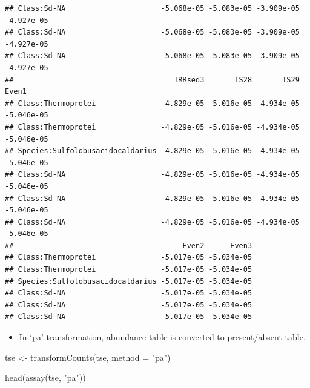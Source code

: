 \documentclass[
]{book}
\newenvironment{Shaded}{\begin{snugshade}}{\end{snugshade}}
\newcommand{\AttributeTok}[1]{\textcolor[rgb]{0.77,0.63,0.00}{#1}}
\newcommand{\FunctionTok}[1]{\textcolor[rgb]{0.00,0.00,0.00}{#1}}
\newcommand{\NormalTok}[1]{#1}
\newcommand{\OtherTok}[1]{\textcolor[rgb]{0.56,0.35,0.01}{#1}}
\newcommand{\StringTok}[1]{\textcolor[rgb]{0.31,0.60,0.02}{#1}}
\providecommand{\tightlist}{%
  \setlength{\itemsep}{0pt}\setlength{\parskip}{0pt}}
\begin{document}
\begin{verbatim}
## Class:Sd-NA                      -5.068e-05 -5.083e-05 -3.909e-05 -4.927e-05
## Class:Sd-NA                      -5.068e-05 -5.083e-05 -3.909e-05 -4.927e-05
## Class:Sd-NA                      -5.068e-05 -5.083e-05 -3.909e-05 -4.927e-05
##                                     TRRsed3       TS28       TS29      Even1
## Class:Thermoprotei               -4.829e-05 -5.016e-05 -4.934e-05 -5.046e-05
## Class:Thermoprotei               -4.829e-05 -5.016e-05 -4.934e-05 -5.046e-05
## Species:Sulfolobusacidocaldarius -4.829e-05 -5.016e-05 -4.934e-05 -5.046e-05
## Class:Sd-NA                      -4.829e-05 -5.016e-05 -4.934e-05 -5.046e-05
## Class:Sd-NA                      -4.829e-05 -5.016e-05 -4.934e-05 -5.046e-05
## Class:Sd-NA                      -4.829e-05 -5.016e-05 -4.934e-05 -5.046e-05
##                                       Even2      Even3
## Class:Thermoprotei               -5.017e-05 -5.034e-05
## Class:Thermoprotei               -5.017e-05 -5.034e-05
## Species:Sulfolobusacidocaldarius -5.017e-05 -5.034e-05
## Class:Sd-NA                      -5.017e-05 -5.034e-05
## Class:Sd-NA                      -5.017e-05 -5.034e-05
## Class:Sd-NA                      -5.017e-05 -5.034e-05
\end{verbatim}

\begin{itemize}
\tightlist
\item
  In `pa' transformation, abundance table is converted to present/absent table.
\end{itemize}

\begin{Shaded}
\begin{Highlighting}[]
\NormalTok{tse }\OtherTok{\textless{}{-}} \FunctionTok{transformCounts}\NormalTok{(tse, }\AttributeTok{method =} \StringTok{"pa"}\NormalTok{)}

\FunctionTok{head}\NormalTok{(}\FunctionTok{assay}\NormalTok{(tse, }\StringTok{"pa"}\NormalTok{))}
\end{Highlighting}
\end{Shaded}
\end{document}
